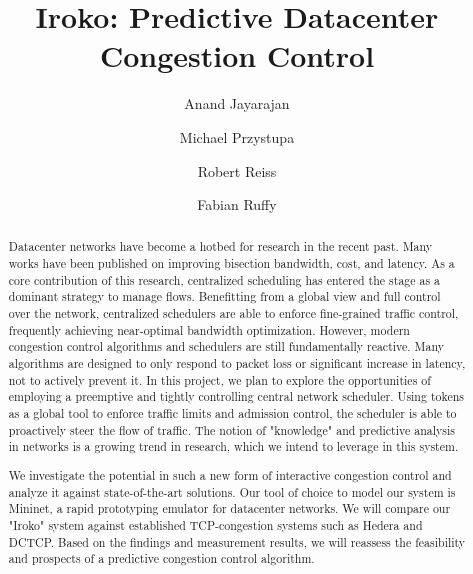 \documentclass[sigconf]{acmart}
\begin{document}
\title{Iroko: Predictive Datacenter Congestion Control}

\author{Anand Jayarajan}

\author{Michael Przystupa}

\author{Robert Reiss}

\author{Fabian Ruffy}

\begin{abstract}
Datacenter networks have become a hotbed for research in the recent past. Many works have been published on improving bisection bandwidth, cost, and latency. As a core contribution of this research, centralized scheduling has entered the stage as a dominant strategy to manage flows. Benefitting from a global view and full control over the network, centralized schedulers are able to enforce fine-grained traffic control, frequently achieving near-optimal bandwidth optimization. However, modern congestion control algorithms and schedulers are still fundamentally reactive. Many algorithms are designed to only respond to packet loss or significant increase in latency, not to actively prevent it.
In this project, we plan to explore the opportunities of employing a preemptive and tightly controlling central network scheduler. Using tokens as a global tool to enforce traffic limits and admission control, the scheduler is able to proactively steer the flow of traffic. The notion of "knowledge" and predictive analysis in networks is a growing trend in research, which we intend to leverage in this system.

We investigate the potential in such a new form of interactive congestion control and analyze it against state-of-the-art solutions. Our tool of choice to model our system is Mininet, a rapid prototyping emulator for datacenter networks. We will compare our "Iroko" system against established TCP-congestion systems such as Hedera and DCTCP. Based on the findings and measurement results, we will reassess the feasibility and prospects of a predictive congestion control algorithm.
\end{abstract}





\maketitle



%









 
\end{document}
